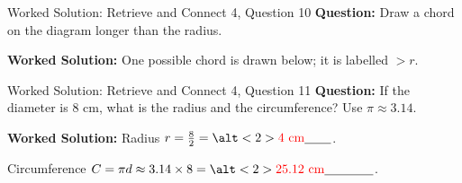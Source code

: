 \documentclass{beamer}
\newcommand{\ablank}[1]{%
  \alt<2>{\textcolor{red}{#1}}{\underline{\phantom{#1}}}%
}
\begin{document}
\begin{frame}{Worked Solution: Retrieve and Connect 4, Question 10}
\small
\textbf{Question:} Draw a chord on the diagram longer than the radius.

\begin{center}
\end{center}

\textbf{Worked Solution:} One possible chord is drawn below; it is labelled \(>r\).
\end{frame}

\begin{frame}{Worked Solution: Retrieve and Connect 4, Question 11}
\small
\textbf{Question:} If the diameter is \(8\) cm, what is the radius and the circumference? Use \(\pi\approx3.14\).

\textbf{Worked Solution:} Radius \(r=\frac{8}{2}=\ablank{4\text{ cm}}\).

Circumference \(C=\pi d\approx3.14\times8=\ablank{25.12\text{ cm}}\).
\end{frame}
\end{document}
